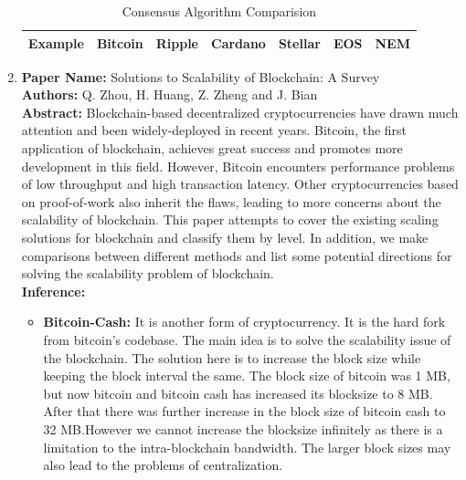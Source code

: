 \documentclass[oneside, 12pt]{book}
\begin{document}
\begin{enumerate}
\begin{table}[H]
{\begin{tabular}{|l|llllll|}
				      Example                                                                & \multicolumn{1}{l|}{Bitcoin}                                                                     & \multicolumn{1}{l|}{Ripple}                                                                 & \multicolumn{1}{l|}{Cardano}               & \multicolumn{1}{l|}{Stellar}      & \multicolumn{1}{l|}{EOS}                                                                  & NEM                                                                  \\ \hline
			      \end{tabular}%
		      }
		      \caption{Consensus Algorithm Comparision}
		      \label{tab:consensus-algorithm-comparision}
	      \end{table}
	\item
	      \textbf{Paper Name:} Solutions to Scalability of Blockchain: A Survey \cite{zhou2020solutions}\\
	      \textbf{Authors:} Q. Zhou, H. Huang, Z. Zheng and J. Bian\\
	      \textbf{Abstract:} Blockchain-based decentralized cryptocurrencies have drawn much attention and been widely-deployed in recent years. Bitcoin, the first application of blockchain, achieves great success and promotes more development in this field. However, Bitcoin encounters performance problems of low throughput and high transaction latency. Other cryptocurrencies based on proof-of-work also inherit the flaws, leading to more concerns about the scalability of blockchain. This paper attempts to cover the existing scaling solutions for blockchain and classify them by level. In addition, we make comparisons between different methods and list some potential directions for solving the scalability problem of blockchain.\\
	      \textbf{Inference:}
	      \begin{itemize}
		      \item\textbf{Bitcoin-Cash:} It is another form of cryptocurrency. It is the hard fork from bitcoin’s codebase. The main idea is to solve the scalability issue of the blockchain. The solution here is to increase the block size while keeping the block interval the same. The block size of bitcoin was 1 MB, but now bitcoin and bitcoin cash has increased its blocksize to 8 MB. After that there was further increase in the block size of bitcoin cash to 32 MB.However we cannot increase the blocksize infinitely as there is a limitation to the intra-blockchain bandwidth. The larger block sizes may also lead to the problems of centralization.

\end{itemize}
\end{enumerate}
\end{document}
